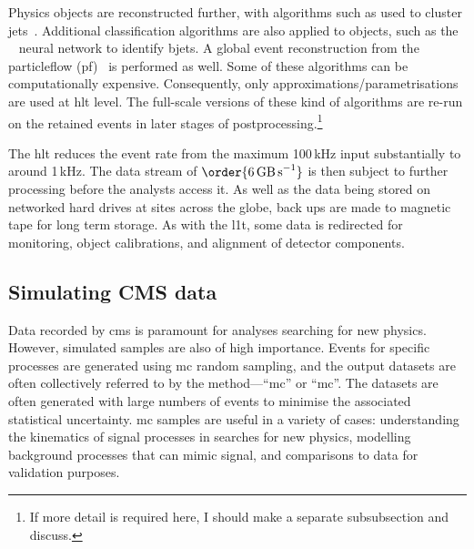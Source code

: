 Physics objects are reconstructed further, with algorithms such as  used to cluster \glspl{jet}~\cite{Cacciari:2008gp}. Additional classification algorithms are also applied to objects, such as the \deepcsv~\cite{Sirunyan:2017ezt} neural network to identify \glspl{bjet}. A global event reconstruction from the \gls{particleflow} (\acrshort{pf})~\cite{CMS-PAS-PFT-09-001,CMS-PRF-14-001} is performed as well. Some of these algorithms can be computationally expensive. Consequently, only approximations/parametrisations are used at \acrshort{hlt} level. The full-scale versions of these kind of algorithms are re-run on the retained events in later stages of postprocessing.\footnote{If more detail is required here, I should make a separate subsubsection and discuss.}

The \acrshort{hlt} reduces the event rate from the maximum 100\,kHz input substantially to around 1\,kHz. The data stream of $\order{\text{6\,GB\,s}^{-1}}$ is then subject to further processing before the analysts access it. As well as the data being stored on networked hard drives at sites across the globe, back ups are made to magnetic tape for long term storage. As with the \acrlong{l1t}, some data is redirected for monitoring, object calibrations, and alignment of detector components.





\subsection{Simulating CMS data}
\label{subsec:cms_mc}

Data recorded by \acrshort{cms} is paramount for analyses searching for new physics. However, simulated samples are also of high importance. Events for specific processes are generated using \acrfull{mc} random sampling, and the output datasets are often collectively referred to by the method---``\acrlong{mc}'' or ``\acrshort{mc}''. The datasets are often generated with large numbers of events to minimise the associated statistical uncertainty. \acrshort{mc} samples are useful in a variety of cases: understanding the kinematics of signal processes in searches for new physics, modelling background processes that can mimic signal, and comparisons to data for validation purposes.

